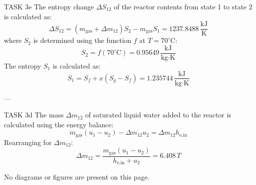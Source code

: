 TASK 3e  
The entropy change \( \Delta S_{12} \) of the reactor contents from state 1 to state 2 is calculated as:  
\[
\Delta S_{12} = (m_{\text{gas}} + \Delta m_{12}) S_2 - m_{\text{gas}} S_1 = 1237.8488 \, \frac{\text{kJ}}{\text{K}}
\]  
where \( S_2 \) is determined using the function \( f \) at \( T = 70^\circ\text{C} \):  
\[
S_2 = f(70^\circ\text{C}) = 0.95649 \, \frac{\text{kJ}}{\text{kg·K}}
\]  
The entropy \( S_1 \) is calculated as:  
\[
S_1 = S_f + x (S_g - S_f) = 1.235744 \, \frac{\text{kJ}}{\text{kg·K}}
\]  

---

TASK 3d  
The mass \( \Delta m_{12} \) of saturated liquid water added to the reactor is calculated using the energy balance:  
\[
m_{\text{gas}} (u_1 - u_2) - \Delta m_{12} u_2 = \Delta m_{12} h_{\text{e,in}}
\]  
Rearranging for \( \Delta m_{12} \):  
\[
\Delta m_{12} = \frac{m_{\text{gas}} (u_1 - u_2)}{h_{\text{e,in}} + u_2} = 6.408 \, T
\]  

No diagrams or figures are present on this page.